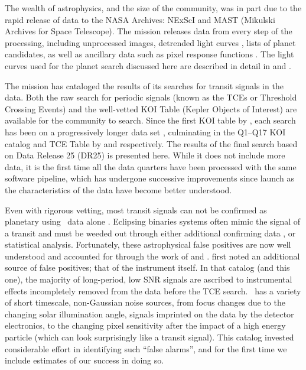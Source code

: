 The wealth of astrophysics, and the size of the \Kepler{} community, was in part due to the rapid release of \Kepler{} data to the NASA Archives: NExScI \citep[NASA Exoplanet Science Institute][]{Acheson14} and MAST (Mikulski Archives for Space Telescope). The \Kepler{} mission releases data from every step of the processing, including unprocessed images, detrended light curves \citep{Stumpe14}, lists of planet candidates, as well as ancillary data such as pixel response functions \citep{Bryson2010b}. The light curves used for the planet search discussed here are described in detail in \citet{DRN25} and \citet{KDCH}.

The mission has cataloged the results of its searches for transit signals in the data. Both the raw search for periodic signals (known as the TCEs or Threshold Crossing Events)  and the well-vetted KOI Table (Kepler Objects of Interest) are available for the community to search.  Since the first KOI table by \citet{Borucki2011a}, each search has been on a progressively longer data set \citep{Bathala12, Burke13, Rowe15, Mullally15}, culminating in the Q1--Q17 KOI catalog and TCE Table by \citet{Coughlin2016} and \citet{Seader2015} respectively.  The results of the final search based on Data Release 25 (DR25) is presented here. While it does not include more data, it is the first time all the data quarters have been processed with the same software pipeline, which has undergone successive improvements since launch as the characteristics of the data have become better understood.

Even with rigorous vetting, most transit signals can not be confirmed as planetary using \Kepler\ data alone \citep[the dominant exception being multi-planet systems][]{Lissauer2014, Rowe2014}. Eclipsing binaries systems often mimic the signal of a transit and must be weeded out through either additional confirming data \citep[such as radial velocities, e.g.][]{Marcy14}, or statistical analysis. Fortunately, these astrophysical false positives are now well understood and accounted for through the work of \citet{Torres2012} and \citet{Morton2016}.
\citet{Mullally2015cat} first noted an additional source of false positives; that of the instrument itself. In that catalog (and this one), the majority of long-period, low SNR signals are ascribed to instrumental effects incompletely removed from the data before the TCE search. \Kepler\ has a variety of short timescale, non-Gaussian noise sources, from focus changes due to the changing solar illumination angle, signals imprinted on the data by the detector electronics, to the changing pixel sensitivity after the impact of a high energy particle (which can look surprisingly like a transit signal). This catalog invested considerable effort in identifying such ``false alarms'', and for the first time we include estimates of our success in doing so.

